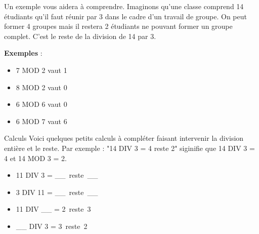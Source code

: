 			Un exemple vous aidera à comprendre.	
			Imaginons qu'une classe comprend 14 étudiants
			qu'il faut réunir par 3
			dans le cadre d'un travail de groupe.
			On peut former 4 groupes 
			mais il restera 2 étudiants ne pouvant former un groupe complet.
			C'est le reste de la division de 14 par 3.
			
			\begin{minipage}{2cm}
			\textbf{Exemples} :	
			\\
			\end{minipage}
			\begin{minipage}{9cm}
			\begin{multicols}{2}
			\begin{itemize}
				\item 7 MOD 2 vaut 1
				\item 8 MOD 2 vaut 0
				\item 6 MOD 6 vaut 0
				\item 6 MOD 7 vaut 6
			\end{itemize}
			\end{multicols}
			\end{minipage}

			\begin{Exercice}{Calculs}
				Voici quelques petits calculs à compléter
				faisant intervenir la division entière et le reste.
				Par exemple : "14 DIV 3 = 4 reste 2"
				siginifie que 14 DIV 3 = 4 et 14 MOD 3 = 2.
				
				\begin{multicols}{2}
					\begin{itemize}
					\item 11 DIV 3 = \_\_\ reste\ \_\_
					\item 3 DIV 11 = \_\_\ reste\ \_\_
					\item 11 DIV \_\_ = 2\ reste\ 3
					\item \_\_ DIV 3 = 3\ reste\ 2
					\end{itemize}
				\end{multicols}
			\end{Exercice}


